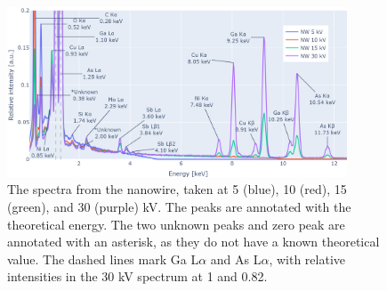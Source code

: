 \begin{figure}[h]
    \centering
    \includegraphics[width=0.90\textwidth]{figures/each_spectra/NW_everything.png}
    \caption{
        The spectra from the nanowire, taken at 5 (blue), 10 (red), 15 (green), and 30 (purple) kV.
        The peaks are annotated with the theoretical energy.
        The two unknown peaks and zero peak are annotated with an asterisk, as they do not have a known theoretical value.
        The dashed lines mark Ga L$\alpha$ and As L$\alpha$, with relative intensities in the 30 kV spectrum at 1 and 0.82.
    }
    \label{fig:results:Spectra_NW}
\end{figure}



